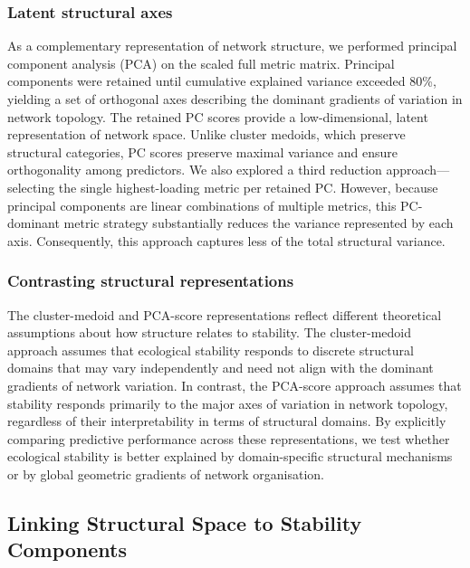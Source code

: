 \documentclass[
]{article}
\begin{document}
\subsubsection{Latent structural axes}\label{latent-structural-axes}

As a complementary representation of network structure, we performed
principal component analysis (PCA) on the scaled full metric matrix.
Principal components were retained until cumulative explained variance
exceeded 80\%, yielding a set of orthogonal axes describing the dominant
gradients of variation in network topology. The retained PC scores
provide a low-dimensional, latent representation of network space.
Unlike cluster medoids, which preserve structural categories, PC scores
preserve maximal variance and ensure orthogonality among predictors. We
also explored a third reduction approach---selecting the single
highest-loading metric per retained PC. However, because principal
components are linear combinations of multiple metrics, this PC-dominant
metric strategy substantially reduces the variance represented by each
axis. Consequently, this approach captures less of the total structural
variance.

\subsubsection{Contrasting structural
representations}\label{contrasting-structural-representations}

The cluster-medoid and PCA-score representations reflect different
theoretical assumptions about how structure relates to stability. The
cluster-medoid approach assumes that ecological stability responds to
discrete structural domains that may vary independently and need not
align with the dominant gradients of network variation. In contrast, the
PCA-score approach assumes that stability responds primarily to the
major axes of variation in network topology, regardless of their
interpretability in terms of structural domains. By explicitly comparing
predictive performance across these representations, we test whether
ecological stability is better explained by domain-specific structural
mechanisms or by global geometric gradients of network organisation.

\subsection{Linking Structural Space to Stability
Components}\label{linking-structural-space-to-stability-components}
\end{document}
